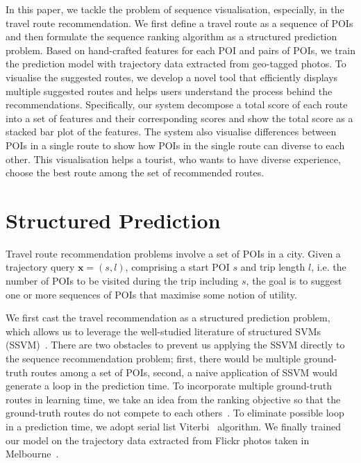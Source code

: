 \documentclass[sigconf]{acmart}
\begin{document}
In this paper, we tackle the problem of sequence visualisation, especially, in the travel route recommendation. 
We first define a travel route as a sequence of POIs and then formulate the sequence ranking algorithm as a structured prediction problem. 
Based on hand-crafted features for each POI and pairs of POIs, we train the prediction model with trajectory data extracted from geo-tagged photos. 
To visualise the suggested routes, we develop a novel tool that efficiently displays multiple suggested routes and helps users understand the process behind the recommendations.
Specifically, our system decompose a total score of each route into a set of features and their corresponding scores and show the total score as a stacked bar plot of the features.
The system also visualise differences between POIs in a single route to show how POIs in the single route can diverse to each other. 
This visualisation helps a tourist, who wants to have diverse experience, choose the best route among the set of recommended routes.

\section{Structured Prediction}
Travel route recommendation problems involve a set of POIs in a city. 
Given a trajectory query $\mathbf{x} = (s, l)$, comprising a start POI $s$ and trip length $l$, i.e. the number of POIs to be visited during the trip including $s$, the goal is to suggest one or more sequences of POIs that maximise some notion of utility.

We first cast the travel recommendation as a structured prediction problem, which allows us to leverage the well-studied literature of structured SVMs (SSVM)~\cite{tsochantaridis2005large,joachims2009predicting}. 
There are two obstacles to prevent us applying the SSVM directly to the sequence recommendation problem; first, there would be multiple ground-truth routes among a set of POIs, second, a naive application of SSVM would generate a loop in the prediction time. 
To incorporate multiple ground-truth routes in learning time, we take an idea from the ranking objective so that the ground-truth routes do not compete to each others~\cite{rendle2009bpr}. 
To eliminate possible loop in a prediction time, we adopt serial list Viterbi~\cite{seshadri1994list,nill1995list} algorithm.
We finally trained our model on the trajectory data extracted from Flickr photos taken in Melbourne~\cite{chen2016learning}.
\end{document}
